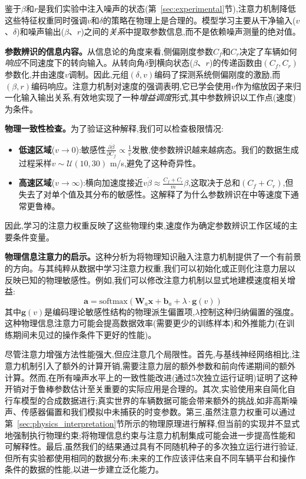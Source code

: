 \documentclass[Afour,sageh,times]{sagej}
\begin{document}
鉴于$\beta$和$r$是我们实验中注入噪声的状态(第~\ref{sec:experimental}节),注意力机制降低这些特征权重同时强调$v$和$\delta$的策略在物理上是合理的。模型学习主要从干净输入($v$、$\delta$)和噪声输出($\beta$、$r$)之间的\textit{关系}中提取参数信息,而不是依赖噪声测量的绝对值。

\textbf{参数辨识的信息内容。}从信息论的角度来看,侧偏刚度参数$C_f$和$C_r$决定了车辆如何\textit{响应}不同速度下的转向输入。从转向角$\delta$到横向状态($\beta$、$r$)的传递函数由$(C_f, C_r)$参数化,并由速度$v$调制。因此,元组$(\delta, v)$编码了探测系统侧偏刚度的激励,而$(\beta, r)$编码响应。注意力机制对速度的强调表明,它已学会使用$v$作为缩放因子来归一化输入输出关系,有效地实现了一种\textit{增益调度}形式,其中参数辨识以工作点(速度)为条件。

\textbf{物理一致性检查。}为了验证这种解释,我们可以检查极限情况:
\begin{itemize}
    \item \textbf{低速区域}($v \to 0$):敏感性$\frac{\partial \dot{\beta}}{\partial C_f} \propto \frac{1}{v}$发散,使参数辨识越来越病态。我们的数据生成过程采样$v \sim \mathcal{U}(10, 30)$ m/s,避免了这种奇异性。
    \item \textbf{高速区域}($v \to \infty$):横向加速度接近$v \dot{\beta} \approx \frac{C_f + C_r}{m}\beta$,这取决于总和$(C_f + C_r)$,但失去了对单个值及其分布的敏感性。这解释了为什么参数辨识在中等速度下通常更鲁棒。
\end{itemize}

因此,学习的注意力权重反映了这些物理约束,速度作为确定参数辨识工作区域的主要条件变量。

\textbf{物理信息注意力的启示。}这种分析为将物理知识融入注意力机制提供了一个有前景的方向。与其纯粹从数据中学习注意力权重,我们可以初始化或正则化注意力层以反映已知的物理敏感性。例如,我们可以修改注意力机制以显式地建模速度相关增益:
\begin{equation}
\mathbf{a} = \text{softmax}\left(\mathbf{W}_a \mathbf{x} + \mathbf{b}_a + \lambda \cdot \mathbf{g}(v)\right)
\end{equation}
其中$\mathbf{g}(v)$是编码理论敏感性结构的物理派生偏置项,$\lambda$控制这种归纳偏置的强度。这种物理信息注意力可能会提高数据效率(需要更少的训练样本)和外推能力(在训练期间未见过的操作条件下更好的性能)。

尽管注意力增强方法性能强大,但应注意几个局限性。首先,与基线神经网络相比,注意力机制引入了额外的计算开销,需要注意力层的额外参数和前向传递期间的额外计算。然而,在所有噪声水平上的一致性能改进(通过5次独立运行证明)证明了这种开销对于鲁棒参数估计至关重要的实际应用是合理的。其次,实验使用来自简化自行车模型的合成数据进行;真实世界的车辆数据可能会带来额外的挑战,如非高斯噪声、传感器偏置和我们模拟中未捕获的时变参数。第三,虽然注意力权重可以通过第~\ref{sec:physics_interpretation}节所示的物理原理进行解释,但当前的实现并不显式地强制执行物理约束;将物理信息约束与注意力机制集成可能会进一步提高性能和可解释性。最后,虽然我们的结果通过具有不同随机种子的多次独立运行进行验证,但所有实验都使用相同的数据分布;未来的工作应该评估来自不同车辆平台和操作条件的数据的性能,以进一步建立泛化能力。
\end{document}
